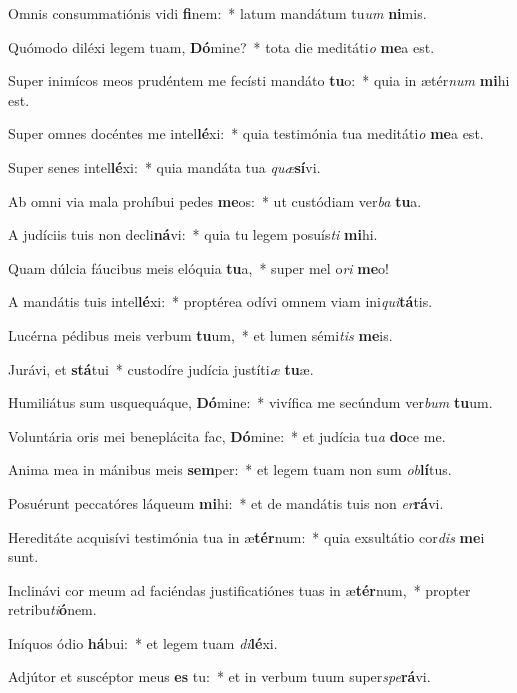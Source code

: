 \item Omnis consummatiónis vidi \textbf{fi}nem:~* latum mandátum tu\textit{um} \textbf{ni}mis.
\item Quómodo diléxi legem tuam, \textbf{Dó}mine?~* tota die meditáti\textit{o} \textbf{me}a est.
\item Super inimícos meos prudéntem me fecísti mandáto \textbf{tu}o:~* quia in ætér\textit{num} \textbf{mi}hi est.
\item Super omnes docéntes me intel\textbf{lé}xi:~* quia testimónia tua meditáti\textit{o} \textbf{me}a est.
\item Super senes intel\textbf{lé}xi:~* quia mandáta tua \textit{quæ}\textbf{sí}vi.
\item Ab omni via mala prohíbui pedes \textbf{me}os:~* ut custódiam ver\textit{ba} \textbf{tu}a.
\item A judíciis tuis non decli\textbf{ná}vi:~* quia tu legem posuís\textit{ti} \textbf{mi}hi.
\item Quam dúlcia fáucibus meis elóquia \textbf{tu}a,~* super mel o\textit{ri} \textbf{me}o!
\item A mandátis tuis intel\textbf{lé}xi:~* proptérea odívi omnem viam ini\textit{qui}\textbf{tá}tis.
\item Lucérna pédibus meis verbum \textbf{tu}um,~* et lumen sémi\textit{tis} \textbf{me}is.
\item Jurávi, et \textbf{stá}tui~* custodíre judícia justíti\textit{æ} \textbf{tu}æ.
\item Humiliátus sum usquequáque, \textbf{Dó}mine:~* vivífica me secúndum ver\textit{bum} \textbf{tu}um.
\item Voluntária oris mei beneplácita fac, \textbf{Dó}mine:~* et judícia tu\textit{a} \textbf{do}ce me.
\item Anima mea in mánibus meis \textbf{sem}per:~* et legem tuam non sum \textit{ob}\textbf{lí}tus.
\item Posuérunt peccatóres láqueum \textbf{mi}hi:~* et de mandátis tuis non \textit{er}\textbf{rá}vi.
\item Hereditáte acquisívi testimónia tua in æ\textbf{tér}num:~* quia exsultátio cor\textit{dis} \textbf{me}i sunt.
\item Inclinávi cor meum ad faciéndas justificatiónes tuas in æ\textbf{tér}num,~* propter retribu\textit{ti}\textbf{ó}nem.
\item Iníquos ódio \textbf{há}bui:~* et legem tuam \textit{di}\textbf{lé}xi.
\item Adjútor et suscéptor meus \textbf{es} tu:~* et in verbum tuum super\textit{spe}\textbf{rá}vi.
